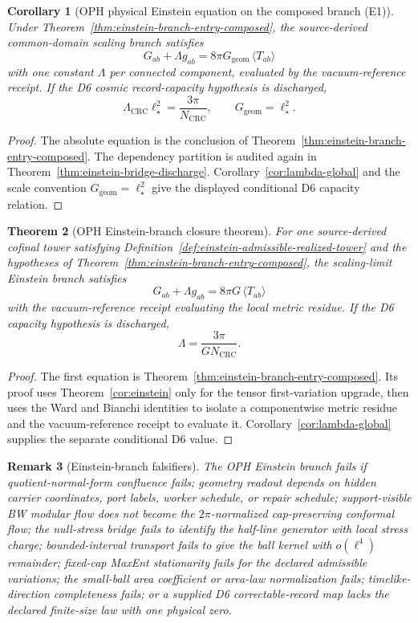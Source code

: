 \documentclass[11pt]{article}
\newtheorem{theorem}{Theorem}[section]
\newtheorem{corollary}[theorem]{Corollary}
\newtheorem{remark}[theorem]{Remark}
\begin{document}
\begin{corollary}[OPH physical Einstein equation on the composed branch (E1)]\label{cor:oph-physical-einstein-equation}
Under Theorem~\ref{thm:einstein-branch-entry-composed}, the source-derived
common-domain scaling branch satisfies
\[
G_{ab}+\Lambda g_{ab}=8\pi G_{\mathrm{geom}}\,
\langle T_{ab}\rangle
\]
with one constant \(\Lambda\) per connected component, evaluated by the
vacuum-reference receipt. If the D6 cosmic record-capacity hypothesis is
discharged,
\[
\Lambda_{\mathrm{CRC}}\ell_\star^2=\frac{3\pi}{N_{\mathrm{CRC}}},
\qquad
G_{\mathrm{geom}}=\ell_\star^2 .
\]
\end{corollary}

\begin{proof}
The absolute equation is the conclusion of
Theorem~\ref{thm:einstein-branch-entry-composed}. The dependency partition is
audited again in Theorem~\ref{thm:einstein-bridge-discharge}.
Corollary~\ref{cor:lambda-global} and the scale convention
\(G_{\mathrm{geom}}=\ell_\star^2\) give the displayed conditional D6 capacity
relation.
\end{proof}

\begin{theorem}[OPH Einstein-branch closure theorem]\label{thm:oph-einstein-branch-closure}
For one source-derived cofinal tower satisfying
Definition~\ref{def:einstein-admissible-realized-tower} and the hypotheses of
Theorem~\ref{thm:einstein-branch-entry-composed}, the scaling-limit Einstein
branch satisfies
\[
G_{ab}+\Lambda g_{ab}=8\pi G\,\langle T_{ab}\rangle
\]
with the vacuum-reference receipt evaluating the local metric residue. If the
D6 capacity hypothesis is discharged,
\[
\Lambda=\frac{3\pi}{G N_{\mathrm{CRC}}}.
\]
\end{theorem}

\begin{proof}
The first equation is Theorem~\ref{thm:einstein-branch-entry-composed}. Its
proof uses Theorem~\ref{cor:einstein} only for the tensor first-variation
upgrade, then uses the Ward and Bianchi identities to isolate a componentwise
metric residue and the vacuum-reference receipt to evaluate it.
Corollary~\ref{cor:lambda-global} supplies the separate conditional D6 value.
\end{proof}

\begin{remark}[Einstein-branch falsifiers]\label{rem:einstein-branch-falsifiers}
The OPH Einstein branch fails if quotient-normal-form confluence fails; geometry
readout depends on hidden carrier coordinates, port labels, worker schedule, or
repair schedule; support-visible BW modular flow does not become the
\(2\pi\)-normalized cap-preserving conformal flow; the null-stress bridge fails
to identify the half-line generator with local stress charge; bounded-interval
transport fails to give the ball kernel with \(o(\ell^4)\) remainder;
fixed-cap MaxEnt stationarity fails for the declared admissible variations; the
small-ball area coefficient or area-law normalization fails; timelike-direction
completeness fails; or a supplied D6 correctable-record map lacks the declared
finite-size law with one physical zero.
\end{remark}
\end{document}
